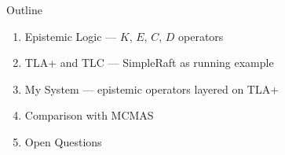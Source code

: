 \documentclass[aspectratio=169,12pt]{beamer}
\begin{document}
\begin{frame}{Outline}
\begin{enumerate}
\item Epistemic Logic --- $K$, $E$, $C$, $D$ operators
\item TLA+ and TLC --- SimpleRaft as running example
\item My System --- epistemic operators layered on TLA+
\item Comparison with MCMAS
\item Open Questions
\end{enumerate}
\end{frame}

\end{document}

